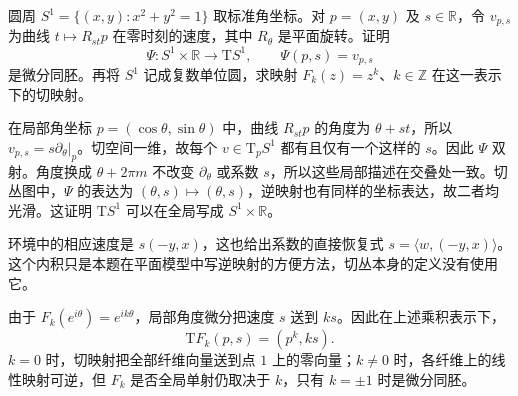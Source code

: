 \begin{exercise}
	\label{g1:ex:circle-tangent-trivialization}
	圆周 \(S^1=\{(x,y):x^2+y^2=1\}\) 取标准角坐标。对 \(p=(x,y)\) 及 \(s\in\mathbb R\)，令 \(v_{p,s}\) 为曲线 \(t\mapsto R_{st}p\) 在零时刻的速度，其中 \(R_\theta\) 是平面旋转。证明
	\[
		\Psi:S^1\times\mathbb R\longrightarrow \mathrm{T}S^1,\qquad
		\Psi(p,s)=v_{p,s}
	\]
	是微分同胚。再将 \(S^1\) 记成复数单位圆，求映射 \(F_k(z)=z^k\)、\(k\in\mathbb Z\) 在这一表示下的切映射。
\end{exercise}
\begin{solution}
	在局部角坐标 \(p=(\cos\theta,\sin\theta)\) 中，曲线 \(R_{st}p\) 的角度为 \(\theta+st\)，所以 \(v_{p,s}=s\partial_\theta|_p\)。切空间一维，故每个 \(v\in \mathrm{T}_pS^1\) 都有且仅有一个这样的 \(s\)。因此 \(\Psi\) 双射。角度换成 \(\theta+2\pi m\) 不改变 \(\partial_\theta\) 或系数 \(s\)，所以这些局部描述在交叠处一致。切丛图中，\(\Psi\) 的表达为 \((\theta,s)\mapsto(\theta,s)\)，逆映射也有同样的坐标表达，故二者均光滑。这证明 \(\mathrm{T}S^1\) 可以在全局写成 \(S^1\times\mathbb R\)。

	环境中的相应速度是 \(s(-y,x)\)，这也给出系数的直接恢复式 \(s=\langle w,(-y,x)\rangle\)。这个内积只是本题在平面模型中写逆映射的方便方法，切丛本身的定义没有使用它。

	由于 \(F_k(e^{i\theta})=e^{ik\theta}\)，局部角度微分把速度 \(s\) 送到 \(ks\)。因此在上述乘积表示下，
	\[
		\mathrm{T}F_k(p,s)=(p^k,ks).
	\]
	\(k=0\) 时，切映射把全部纤维向量送到点 \(1\) 上的零向量；\(k\ne0\) 时，各纤维上的线性映射可逆，但 \(F_k\) 是否全局单射仍取决于 \(k\)，只有 \(k=\pm1\) 时是微分同胚。
\end{solution}

